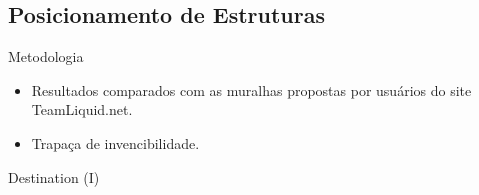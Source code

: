 \documentclass{beamer}
\begin{document}
\subsection{Posicionamento de Estruturas}
\begin{frame}{Metodologia}
\begin{itemize}
  \item Resultados comparados com as muralhas propostas por usuários do site TeamLiquid.net.
  \item Trapaça de invencibilidade.
\end{itemize}
\end{frame}
\begin{frame}{Destination (I)}
  \begin{figure}
  \centering
  \enskip
  \label{fig:exp-dest}
\end{figure}
\end{frame}
\end{document}

